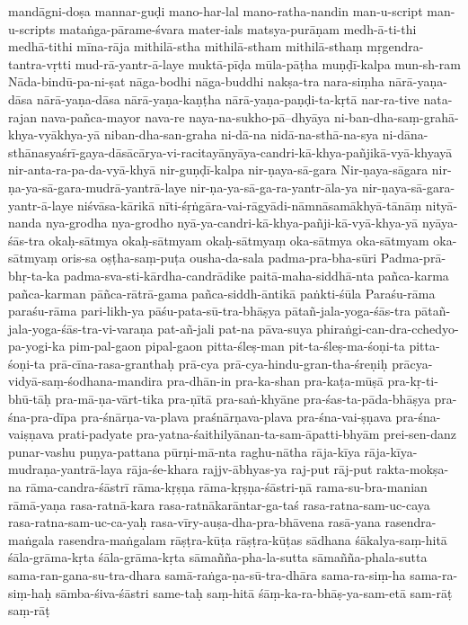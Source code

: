 {mandāgni-doṣa
mannar-guḍi
mano-har-lal
mano-ratha-nandin
man-u-script
man-u-scripts
mataṅga-pārame-śvara
mater-ials
matsya-purāṇam
medh-ā-ti-thi
medhā-tithi
mīna-rāja
mithilā-stha
mithilā-stham
mithilā-sthaṃ
mṛgendra-tantra-vṛtti
mud-rā-yantr-ā-laye
muktā-pīḍa
mūla-pāṭha
muṇḍī-kalpa
mun-sh-ram
Nāda-bindū-pa-ni-ṣat
nāga-bodhi
nāga-buddhi
nakṣa-tra
nara-siṃha
nārā-yaṇa-dāsa
nārā-yaṇa-dāsa
nārā-yaṇa-kaṇṭha
nārā-yaṇa-paṇḍi-ta-kṛtā
nar-ra-tive
nata-rajan
nava-pañca-mayor
nava-re
naya-na-sukho-pā--dhyāya
ni-ban-dha-saṃ-grahā-khya-vyākhya-yā
niban-dha-san-graha
ni-dā-na
nidā-na-sthā-na-sya
ni-dāna-sthānasyaśrī-gaya-dāsācārya-vi-racitayānyāya-candri-kā-khya-pañjikā-vyā-khyayā
nir-anta-ra-pa-da-vyā-khyā
nir-guṇḍī-kalpa
nir-ṇaya-sā-gara
Nir-ṇaya-sāgara
nir-ṇa-ya-sā-gara-mudrā-yantrā-laye
nir-ṇa-ya-sā-ga-ra-yantr-āla-ya
nir-ṇaya-sā-gara-yantr-ā-laye
niśvāsa-kārikā
nīti-śṛṅgāra-vai-rāgyādi-nāmnāsamākhyā-tānāṃ
nityā-nanda
nya-grodha
nya-grodho
nyā-ya-candri-kā-khya-pañji-kā-vyā-khya-yā
nyāya-śās-tra
okaḥ-sātmya
okaḥ-sātmyam
okaḥ-sātmyaṃ
oka-sātmya
oka-sātmyam
oka-sātmyaṃ
oris-sa
oṣṭha-saṃ-puṭa
ousha-da-sala
padma-pra-bha-sūri
Padma-prā-bhṛ-ta-ka
padma-sva-sti-kārdha-candrādike
paitā-maha-siddhā-nta
pañca-karma
pañca-karman
pāñca-rātrā-gama
pañca-siddh-āntikā
paṅkti-śūla
Paraśu-rāma
paraśu-rāma
pari-likh-ya
pāśu-pata-sū-tra-bhāṣya
pātañ-jala-yoga-śās-tra
pātañ-jala-yoga-śās-tra-vi-varaṇa
pat-añ-jali
pat-na
pāva-suya
phiraṅgi-can-dra-cchedyo-pa-yogi-ka
pim-pal-gaon
pipal-gaon
pitta-śleṣ-man
pit-ta-śleṣ-ma-śoṇi-ta
pitta-śoṇi-ta
prā-cīna-rasa-granthaḥ
prā-cya
prā-cya-hindu-gran-tha-śreṇiḥ
prācya-vidyā-saṃ-śodhana-mandira
pra-dhān-in
pra-ka-shan
pra-kaṭa-mūṣā
pra-kṛ-ti-bhū-tāḥ
pra-mā-ṇa-vārt-tika
pra-ṇītā
pra-saṅ-khyāne
pra-śas-ta-pāda-bhāṣya
pra-śna-pra-dīpa
pra-śnārṇa-va-plava
praśnārṇava-plava
pra-śna-vai-ṣṇava
pra-śna-vaiṣṇava
prati-padyate
pra-yatna-śaithilyānan-ta-sam-āpatti-bhyām
prei-sen-danz
punar-vashu
puṇya-pattana
pūrṇi-mā-nta
raghu-nātha
rāja-kīya
rāja-kīya-mudraṇa-yantrā-laya
rāja-śe-khara
rajjv-ābhyas-ya
raj-put
rāj-put
rakta-mokṣa-na
rāma-candra-śāstrī
rāma-kṛṣṇa
rāma-kṛṣṇa-śāstri-ṇā
rama-su-bra-manian
rāmā-yaṇa
rasa-ratnā-kara
rasa-ratnākarāntar-ga-taś
rasa-ratna-sam-uc-caya
rasa-ratna-sam-uc-ca-yaḥ
rasa-vīry-auṣa-dha-pra-bhāvena
rasā-yana
rasendra-maṅgala
rasendra-maṅgalam
rāṣṭra-kūṭa
rāṣṭra-kūṭas
sādhana
śākalya-saṃ-hitā
śāla-grāma-kṛta
śāla-grāma-kṛta
sāmañña-pha-la-sutta
sāmañña-phala-sutta
sama-ran-gana-su-tra-dhara
samā-raṅga-ṇa-sū-tra-dhāra
sama-ra-siṃ-ha
sama-ra-siṃ-haḥ
sāmba-śiva-śāstri
same-taḥ
saṃ-hitā
śāṃ-ka-ra-bhāṣ-ya-sam-etā
sam-rāṭ
saṃ-rāṭ
}
